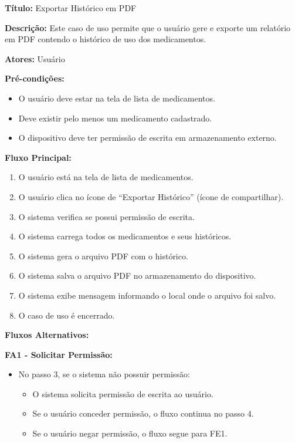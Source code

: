 \documentclass[12pt]{article}
\begin{document}
\textbf{Título:} Exportar Histórico em PDF

\textbf{Descrição:} Este caso de uso permite que o usuário gere e exporte um relatório em PDF contendo o histórico de uso dos medicamentos.

\textbf{Atores:} Usuário

\textbf{Pré-condições:}
\begin{itemize}
    \item O usuário deve estar na tela de lista de medicamentos.
    \item Deve existir pelo menos um medicamento cadastrado.
    \item O dispositivo deve ter permissão de escrita em armazenamento externo.
\end{itemize}

\textbf{Fluxo Principal:}
\begin{enumerate}
    \item O usuário está na tela de lista de medicamentos.
    \item O usuário clica no ícone de ``Exportar Histórico'' (ícone de compartilhar).
    \item O sistema verifica se possui permissão de escrita.
    \item O sistema carrega todos os medicamentos e seus históricos.
    \item O sistema gera o arquivo PDF com o histórico.
    \item O sistema salva o arquivo PDF no armazenamento do dispositivo.
    \item O sistema exibe mensagem informando o local onde o arquivo foi salvo.
    \item O caso de uso é encerrado.
\end{enumerate}

\textbf{Fluxos Alternativos:}

\textbf{FA1 - Solicitar Permissão:}
\begin{itemize}
    \item No passo 3, se o sistema não possuir permissão:
    \begin{itemize}
        \item O sistema solicita permissão de escrita ao usuário.
        \item Se o usuário conceder permissão, o fluxo continua no passo 4.
        \item Se o usuário negar permissão, o fluxo segue para FE1.
    \end{itemize}
\end{itemize}
\end{document}

